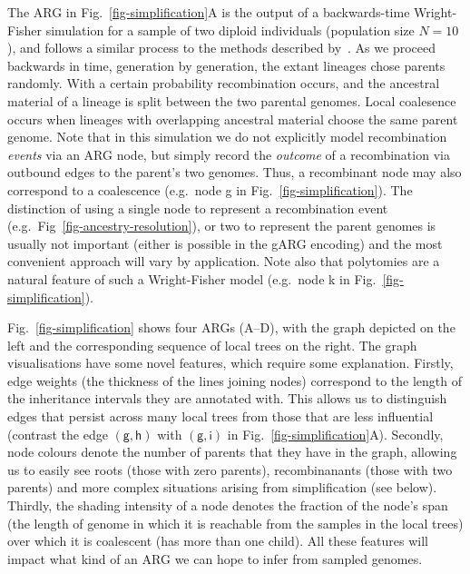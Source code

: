 \documentclass{article}
\newcommand{\noderef}[1]{\textsf{#1}}
\begin{document}
The ARG in Fig.~\ref{fig-simplification}A is the output of a
backwards-time Wright-Fisher simulation for a sample of two diploid
individuals (population size $N=10$), and follows a similar process
to the methods described by~\cite{nelson2020accounting}.
As we proceed backwards in time, generation by generation, the
extant lineages chose parents randomly.
With a certain probability recombination occurs, and the ancestral
material of a lineage is split between the two parental
genomes. Local coalesence occurs
when lineages with overlapping ancestral material choose the same
parent genome.
Note that in this simulation we do not explicitly
model recombination \emph{events} via an ARG node, but simply record
the \emph{outcome} of a recombination via outbound edges to
the parent's two genomes.
Thus, a recombinant node may also correspond to a coalescence
(e.g.~node \noderef{g} in Fig.~\ref{fig-simplification}).
The distinction of
using a single node to represent
a recombination event (e.g.~Fig~\ref{fig-ancestry-resolution}),
or two to represent the parent genomes is usually not important
(either is possible in the gARG encoding)
and the most convenient approach will vary by application.
Note also that polytomies are a natural feature of such
a Wright-Fisher model
(e.g.~node \noderef{k} in Fig.~\ref{fig-simplification}).

Fig.~\ref{fig-simplification} shows four ARGs (A--D), with
the graph depicted on the left and the corresponding sequence
of local trees on the right. The graph visualisations have
some novel features, which require some explanation.
Firstly, edge weights (the thickness of the lines joining
nodes) correspond to the length of the inheritance intervals
they are annotated with. This allows us to distinguish
edges that persist across many local trees from those that are
less influential (contrast the edge
$(\noderef{g}, \noderef{h})$
with $(\noderef{g}, \noderef{i})$
in Fig.~\ref{fig-simplification}A).
Secondly, node colours denote the number of parents that they
have in the graph, allowing us to easily see roots (those
with zero parents), recombinanants (those with two parents)
and more complex situations arising from simplification (see below).
Thirdly, the shading intensity of a node denotes the
fraction of the node's span (the length of genome in which it
is reachable from the samples in the local trees)
over which it is coalescent (has more than one child).
All these features will impact what kind of an ARG we can
hope to infer from sampled genomes.
\end{document}

